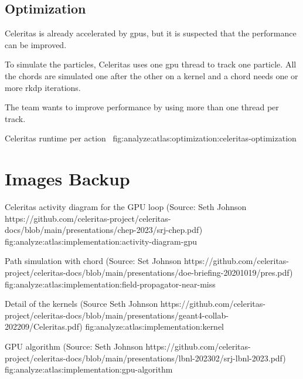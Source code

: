 \subsection{Optimization}
\label{ch:analyze:atlas:optimization}

Celeritas is already accelerated by \acrshort{gpu}s, but it is suspected that
the performance can be improved.

To simulate the particles, Celeritas uses one \acrshort{gpu} thread to track one particle.
All the chords are simulated one after the other on a kernel and a chord needs
one or more \acrshort{rkdp} iterations.

The team wants to improve performance by using more than one thread per
track.

{Celeritas runtime per action~\cite{chep2023-presentation-johnson}}
{fig:analyze:atlas:optimization:celeritas-optimization}





\section{Images Backup}
\label{ch:analyze:images}

{Celeritas activity diagram for the GPU loop (Source: Seth Johnson https://github.com/celeritas-project/celeritas-docs/blob/main/presentations/chep-2023/srj-chep.pdf)}
{fig:analyze:atlas:implementation:activity-diagram-gpu}

{Path simulation with chord (Source: Set Johnson https://github.com/celeritas-project/celeritas-docs/blob/main/presentations/doe-briefing-20201019/pres.pdf)}
{fig:analyze:atlas:implementation:field-propagator-near-miss}

{Detail of the kernels (Source Seth Johnson https://github.com/celeritas-project/celeritas-docs/blob/main/presentations/geant4-collab-202209/Celeritas.pdf)}
{fig:analyze:atlas:implementation:kernel}

{GPU algorithm (Source: Seth Johnson https://github.com/celeritas-project/celeritas-docs/blob/main/presentations/lbnl-202302/srj-lbnl-2023.pdf)}
{fig:analyze:atlas:implementation:gpu-algorithm}
